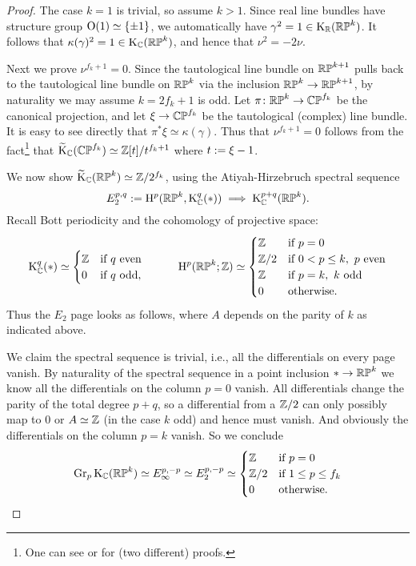 \begin{proof}
  The case $k=1$ is trivial, so assume $k > 1$. Since real line
  bundles have structure group $\mathrm{O}(1) \simeq \{\pm 1\}$, we
  automatically have $\gamma^2 = 1 \in \mathrm{K}_{\mathbb{R}}(\mathbb{RP}^k)$. It follows that
  $\kappa(\gamma)^2 = 1 \in \mathrm{K}_{\mathbb{C}}(\mathbb{RP}^k)$, and hence that $\nu^2 =
  -2\nu$.

  Next we prove $\nu^{f_k+1} = 0$. Since the tautological line bundle on
  $\mathbb{RP}^{k+1}$ pulls back to the tautological line bundle on $\mathbb{RP}^k$
  via the inclusion $\mathbb{RP}^k \to \mathbb{RP}^{k+1}$, by naturality we may assume
  $k = 2f_k+1$ is odd. Let $\pi \colon \mathbb{RP}^k \to \mathbb{CP}^{f_k}$ be the canonical
  projection, and let $\xi \to \mathbb{CP}^{f_k}$ be the tautological (complex)
  line bundle. It is easy to see directly that $\pi^*\xi \simeq
  \kappa(\gamma)$. Thus that $\nu^{f_k+1} = 0$ follows from the
  fact\footnote{One can see \cite{atiyah-kthy} or \cite{adams-vfields}
    for (two different) proofs.}  that $\widetilde{\mathrm{K}}_{\mathbb{C}}(\mathbb{CP}^{f_k}) \simeq
  \mathbb{Z}[t]/t^{f_k+1}$ where $t \mathrel{:=} \xi - 1$.

  We now show $\widetilde{\mathrm{K}}_{\mathbb{C}}(\mathbb{RP}^k) \simeq \mathbb{Z}/2^{f_k}$, using the
  Atiyah-Hirzebruch spectral sequence
  \[
  E_2^{p,q} \mathrel{:=} \mathrm{H}^p(\mathbb{RP}^k,\mathrm{K}_{\mathbb{C}}^q(*)) \implies \mathrm{K}_{\mathbb{C}}^{p+q}(\mathbb{RP}^k).
  \]
  Recall Bott periodicity and the cohomology of projective space:
  \[
  \mathrm{K}_{\mathbb{C}}^q(*) \simeq
  \begin{cases}
    \mathbb{Z} & \text{if }q\text{ even} \\
    0 & \text{if }q\text{ odd},
  \end{cases}
  \hspace{30pt}
  \mathrm{H}^p(\mathbb{RP}^k;\mathbb{Z}) \simeq
  \begin{cases}
    \mathbb{Z} & \text{if }p=0 \\
    \mathbb{Z}/2 & \text{if }0 < p \le k,\ p\text{ even} \\
    \mathbb{Z} & \text{if }p=k,\ k\text{ odd} \\
    0 & \text{otherwise}.
  \end{cases}
  \]  
  Thus the $E_2$ page looks as follows, where $A$ depends on the parity
  of $k$ as indicated above.

  

  We claim the spectral sequence is trivial, i.e., all the
  differentials on every page vanish. By naturality of the spectral
  sequence in a point inclusion $* \to \mathbb{RP}^k$ we know all the
  differentials on the column $p=0$ vanish. All differentials change
  the parity of the total degree $p+q$, so a differential from a
  $\mathbb{Z}/2$ can only possibly map to $0$ or $A \simeq\mathbb{Z}$ (in the case $k$
  odd) and hence must vanish. And obviously the differentials on the
  column $p=k$ vanish. So we conclude
  \[
  \operatorname{Gr}_p\mathrm{K}_{\mathbb{C}}(\mathbb{RP}^k) \simeq E_\infty^{p,-p} \simeq E_2^{p,-p} \simeq
  \begin{cases}
    \mathbb{Z} & \text{if }p = 0\\
    \mathbb{Z}/2 & \text{if }1 \le p \le f_k\\
    0 & \text{otherwise}.
  \end{cases}
  \]


\end{proof}
